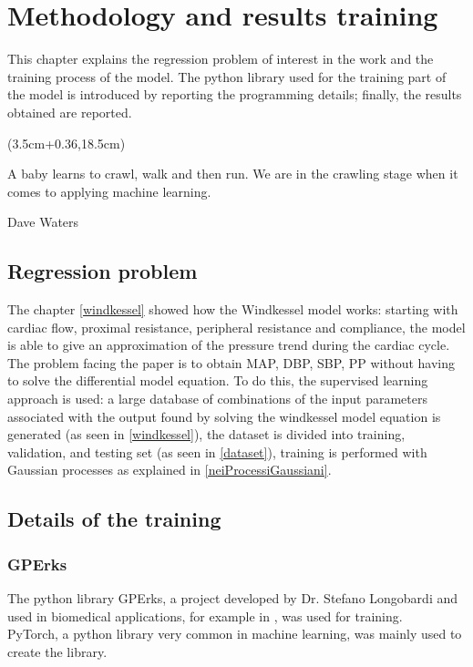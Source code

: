 \chapter{Methodology and results training}\label{Capitolo: risultati training}


This chapter explains the regression problem of interest in the work and the training process of the model. The python library used for the training part of the model is introduced by reporting the programming details; finally, the results obtained are reported.


\begin{textblock*}{0.64\textwidth}(3.5cm+0.36\textwidth,18.5cm)
\epigraph{A baby learns to crawl, walk and then run. We are in the crawling stage when it comes to applying machine learning.}{Dave Waters}
\end{textblock*}

\newpage

\section{Regression problem}
The chapter \ref{windkessel} showed how the Windkessel model works: starting with cardiac flow, proximal resistance, peripheral resistance and compliance, the model is able to give an approximation of the pressure trend during the cardiac cycle.\\
The problem facing the paper is to obtain MAP, DBP, SBP, PP without having to solve the differential model equation. To do this, the supervised learning approach is used: a large database of combinations of the input parameters associated with the output found by solving the windkessel model equation is generated (as seen in \ref{windkessel}), the dataset is divided into training, validation, and testing set (as seen in \ref{dataset}), training is performed with Gaussian processes as explained in \ref{neiProcessiGaussiani}.


\section{Details of the training}

\subsection{GPErks}
The python library GPErks, a project developed by Dr. Stefano Longobardi and used in biomedical applications, for example in \cite{doi:10.1098/rsta.2019.0334}, was used for training.\\
PyTorch, a python library very common in machine learning, was mainly used to create the library.\\

